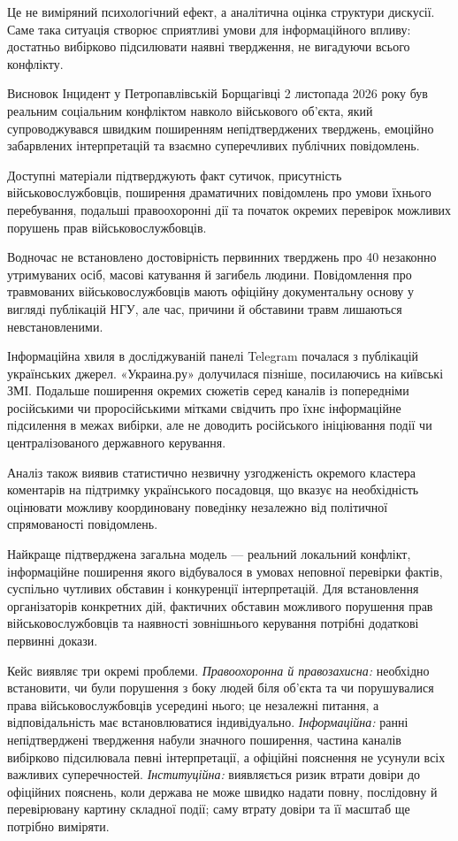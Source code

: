 Це не виміряний психологічний ефект, а аналітична оцінка структури дискусії. Саме така ситуація створює сприятливі умови для інформаційного впливу: достатньо вибірково підсилювати наявні твердження, не вигадуючи всього конфлікту.

\begin{keybox}{Висновок}
Інцидент у Петропавлівській Борщагівці 2 листопада 2026 року був реальним соціальним конфліктом навколо військового об'єкта, який супроводжувався швидким поширенням непідтверджених тверджень, емоційно забарвлених інтерпретацій та взаємно суперечливих публічних повідомлень.

Доступні матеріали підтверджують факт сутичок, присутність військовослужбовців, поширення драматичних повідомлень про умови їхнього перебування, подальші правоохоронні дії та початок окремих перевірок можливих порушень прав військовослужбовців.

Водночас не встановлено достовірність первинних тверджень про 40 незаконно утримуваних осіб, масові катування й загибель людини. Повідомлення про травмованих військовослужбовців мають офіційну документальну основу у вигляді публікацій НГУ, але час, причини й обставини травм лишаються невстановленими.

Інформаційна хвиля в досліджуваній панелі Telegram почалася з публікацій українських джерел. «Украина.ру» долучилася пізніше, посилаючись на київські ЗМІ. Подальше поширення окремих сюжетів серед каналів із попередніми російськими чи проросійськими мітками свідчить про їхнє інформаційне підсилення в межах вибірки, але не доводить російського ініціювання події чи централізованого державного керування.

Аналіз також виявив статистично незвичну узгодженість окремого кластера коментарів на підтримку українського посадовця, що вказує на необхідність оцінювати можливу координовану поведінку незалежно від політичної спрямованості повідомлень.

Найкраще підтверджена загальна модель --- реальний локальний конфлікт, інформаційне поширення якого відбувалося в умовах неповної перевірки фактів, суспільно чутливих обставин і конкуренції інтерпретацій. Для встановлення організаторів конкретних дій, фактичних обставин можливого порушення прав військовослужбовців та наявності зовнішнього керування потрібні додаткові первинні докази.
\end{keybox}

Кейс виявляє три окремі проблеми. \emph{Правоохоронна й правозахисна:} необхідно встановити, чи були порушення з боку людей біля об'єкта та чи порушувалися права військовослужбовців усередині нього; це незалежні питання, а відповідальність має встановлюватися індивідуально. \emph{Інформаційна:} ранні непідтверджені твердження набули значного поширення, частина каналів вибірково підсилювала певні інтерпретації, а офіційні пояснення не усунули всіх важливих суперечностей. \emph{Інституційна:} виявляється ризик втрати довіри до офіційних пояснень, коли держава не може швидко надати повну, послідовну й перевірювану картину складної події; саму втрату довіри та її масштаб ще потрібно виміряти.

